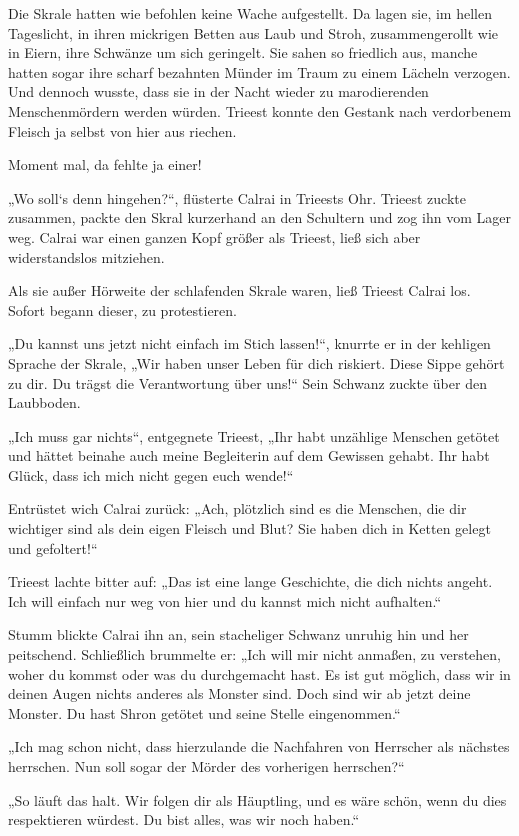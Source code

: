 Die Skrale hatten wie befohlen keine Wache aufgestellt. Da lagen sie, im hellen Tageslicht, in ihren mickrigen Betten aus Laub und Stroh, zusammengerollt wie in Eiern, ihre Schwänze um sich geringelt. Sie sahen so friedlich aus, manche hatten sogar ihre scharf bezahnten Münder im Traum zu einem Lächeln verzogen. Und dennoch wusste, dass sie in der Nacht wieder zu marodierenden Menschenmördern werden würden. Trieest konnte den Gestank nach verdorbenem Fleisch ja selbst von hier aus riechen.

Moment mal, da fehlte ja einer!

„Wo soll‘s denn hingehen?“, flüsterte Calrai in Trieests Ohr. Trieest zuckte zusammen, packte den Skral kurzerhand an den Schultern und zog ihn vom Lager weg. Calrai war einen ganzen Kopf größer als Trieest, ließ sich aber widerstandslos mitziehen.

Als sie außer Hörweite der schlafenden Skrale waren, ließ Trieest Calrai los. Sofort begann dieser, zu protestieren.

„Du kannst uns jetzt nicht einfach im Stich lassen!“, knurrte er in der kehligen Sprache der Skrale, „Wir haben unser Leben für dich riskiert. Diese Sippe gehört zu dir. Du trägst die Verantwortung über uns!“ Sein Schwanz zuckte über den Laubboden.

„Ich muss gar nichts“, entgegnete Trieest, „Ihr habt unzählige Menschen getötet und hättet beinahe auch meine Begleiterin auf dem Gewissen gehabt. Ihr habt Glück, dass ich mich nicht gegen euch wende!“

Entrüstet wich Calrai zurück: „Ach, plötzlich sind es die Menschen, die dir wichtiger sind als dein eigen Fleisch und Blut? Sie haben dich in Ketten gelegt und gefoltert!“

Trieest lachte bitter auf: „Das ist eine lange Geschichte, die dich nichts angeht. Ich will einfach nur weg von hier und du kannst mich nicht aufhalten.“

Stumm blickte Calrai ihn an, sein stacheliger Schwanz unruhig hin und her peitschend. Schließlich brummelte er: „Ich will mir nicht anmaßen, zu verstehen, woher du kommst oder was du durchgemacht hast. Es ist gut möglich, dass wir in deinen Augen nichts anderes als Monster sind. Doch sind wir ab jetzt deine Monster. Du hast Shron getötet und seine Stelle eingenommen.“

„Ich mag schon nicht, dass hierzulande die Nachfahren von Herrscher als nächstes herrschen. Nun soll sogar der Mörder des vorherigen herrschen?“

„So läuft das halt. Wir folgen dir als Häuptling, und es wäre schön, wenn du dies respektieren würdest. Du bist alles, was wir noch haben.“

